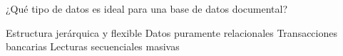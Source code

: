 \question[1] ¿Qué tipo de datos es ideal para una base de datos documental?
\begin{choices}
\CorrectChoice Estructura jerárquica y flexible
\choice Datos puramente relacionales
\choice Transacciones bancarias
\choice Lecturas secuenciales masivas
\end{choices}